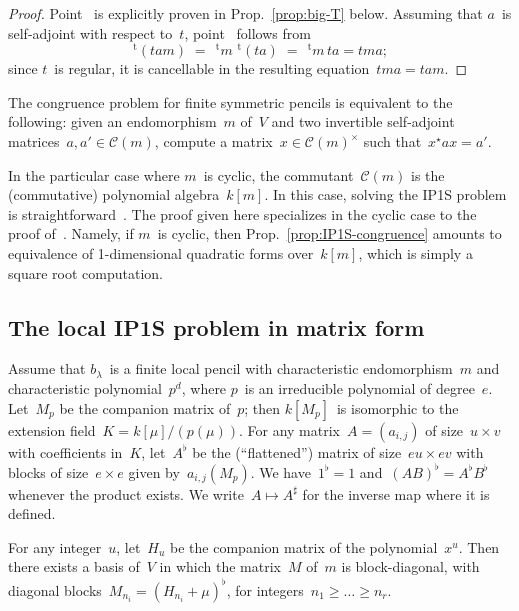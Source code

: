 \documentclass{lms}%
\let\ro\mathscr
\def\transpose{\,{}^{\mathrm{t}\!}}
\begin{document}
\begin{proof}
Point~ is explicitly proven in Prop.~\ref{prop:big-T}
below. Assuming that $a$~is self-adjoint with respect to~$t$,
point~ follows from
\begin{equation}
\transpose{(tam)} \;=\; \transpose{m}\, \transpose{(ta)}
 \;=\; \transpose{m}\,ta = tma;
\end{equation}
since $t$~is regular, it is cancellable in the resulting equation~$tma
= tam$.
\end{proof}

\begin{prop}\label{prop:IP1S-congruence}
The congruence problem for finite symmetric pencils is equivalent to the
following: given an endomorphism~$m$ of~$V$ and two invertible
self-adjoint matrices~$a, a' ∈ \ro C(m)$, compute a matrix~$x ∈ \ro
C(m)^{×}$ such that~$x^{⋆} a x = a'$.
\end{prop}

In the particular case where $m$~is cyclic, the commutant~$\ro C(m)$ is
the (commutative) polynomial algebra~$k[m]$. In this case, solving the
IP1S problem is straightforward~\cite{MPG2013}. The proof given here
specializes in the cyclic case to the proof of~\cite{MPG2013}. Namely, if
$m$~is cyclic, then Prop.~\ref{prop:IP1S-congruence} amounts to
equivalence of 1-dimensional quadratic forms over~$k[m]$, which is simply
a square root computation.

\subsection{The local IP1S problem in matrix form}%

Assume that $b_{λ}$~is a finite local pencil with characteristic
endomorphism~$m$ and characteristic polynomial~$p^d$, where $p$~is an
irreducible polynomial of degree~$e$. Let~$M_p$ be the companion matrix
of~$p$; then $k[M_p]$~is isomorphic to the extension field~$K =
k[μ]/(p(μ))$. For any matrix~$A = (a_{i,j})$ of size~$u × v$ with
coefficients in~$K$, let~$A^{♭}$ be the (``flattened'') matrix of
size~$eu × ev$ with blocks of size~$e × e$ given by~$a_{i,j}(M_p)$. We
have~$1^{♭} = 1$ and~$(AB)^{♭} = A^{♭} B^{♭}$ whenever the product
exists. We write~$A ↦ A^{♯}$ for the inverse map where it is defined.

For any integer~$u$, let~$H_u$ be the companion matrix of the
polynomial~$x^u$. Then there exists a basis of~$V$ in which the
matrix~$M$ of~$m$ is block-diagonal, with diagonal blocks~$M_{n_i} =
(H_{n_i} + μ)^{♭}$, for integers~$n_1 ≥ … ≥ n_r$.
\end{document}
